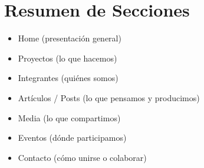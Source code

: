 \documentclass[12pt]{article}
\begin{document}
\section*{Resumen de Secciones}
\begin{itemize}[label=--]
    \item Home (presentación general)
    \item Proyectos (lo que hacemos)
    \item Integrantes (quiénes somos)
    \item Artículos / Posts (lo que pensamos y producimos)
    \item Media (lo que compartimos)
    \item Eventos (dónde participamos)
    \item Contacto (cómo unirse o colaborar)
\end{itemize}
\end{document}
